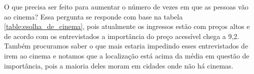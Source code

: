 \documentclass[12pt]{article}
\begin{document}
        \begin{table}[h!]
            \centering
            \caption{Frequência que o entrevistado vai ao cinema }
            \label{table:freq_cinema}
        \end{table}
        \FloatBarrier
        O que precisa ser feito para aumentar o número de vezes em que as pessoas vão ao cinema? Essa pergunta se responde com base na tabela \ref{table:esolha_de_cinema}, pois atualmente os ingressos estão com preços altos e de acordo com os entrevistados a importância do preço acessível chega a 9,2. Também procuramos saber o que mais estaria impedindo esses entrevistados de irem ao cinema e notamos que a localização está acima da média em questão de importância, pois a maioria deles moram em cidades onde não há cinemas. 
\end{document}
